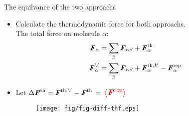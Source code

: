 \documentclass[]{beamer}
\newcommand{\redc}[1]{{\color{red} #1}}
\newcommand{\bluec}[1]{{\color{blue} #1}}
\newcommand{\vect}[1]{\textbf{\textit{#1}}}
\newcommand{\thf}{{\textrm{th}}}
\newcommand{\rep}{{\textrm{rep}}}
\begin{document}
\begin{frame}{The equilvance of the two approachs}
  \begin{itemize}\itemsep -1.0cm
  \item <1-> Calculate the thermodynamic force for both approachs.\\
    The total force on molecule $\alpha$:
    \bluec{
      \begin{align*}
        \vect F_\alpha &= \sum_\beta \vect F_{\alpha\beta} + \vect F^\thf_\alpha\\
        \vect F^V_\alpha &= \sum_\beta \vect F_{\alpha\beta} + \vect F^{\thf,V}_\alpha - \vect F_\alpha^\rep\\
      \end{align*}
    }
  \item <2-> Let  \bluec{$\Delta \vect F^\thf = \vect F^{\thf,V} - \vect F^\thf
      \,=\, \redc{\mathlarger{\mathlarger{\langle \vect F^\rep \rangle}}}$}
  \begin{figure}
    \centering 
    \texttt{[image: fig/fig-diff-thf.eps]}
  \end{figure}      
  \end{itemize}
\end{frame}
\end{document}
